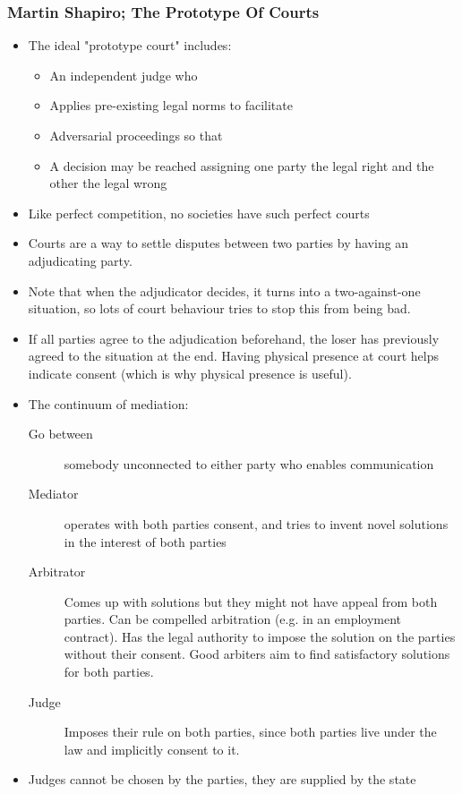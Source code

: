 \documentclass[11pt]{article}
\begin{document}
\subsubsection{Martin Shapiro; The Prototype Of Courts}
\label{sec:orgca5c35e}
\begin{itemize}
\item The ideal "prototype court" includes:
\begin{itemize}
\item An independent judge who
\item Applies pre-existing legal norms to facilitate
\item Adversarial proceedings so that
\item A decision may be reached assigning one party the legal right and the other
the legal wrong
\end{itemize}
\item Like perfect competition, no societies have such perfect courts
\item Courts are a way to settle disputes between two parties by having an
adjudicating party.
\item Note that when the adjudicator decides, it turns into a two-against-one
situation, so lots of court behaviour tries to stop this from being bad.
\item If all parties agree to the adjudication beforehand, the loser has previously
agreed to the situation at the end. Having physical presence at court helps
indicate consent (which is why physical presence is useful).
\item The continuum of mediation:
\begin{description}
\item[{Go between}] somebody unconnected to either party who enables communication
\item[{Mediator}] operates with both parties consent, and tries to invent novel
solutions in the interest of both parties
\item[{Arbitrator}] Comes up with solutions but they might not have appeal from
both parties. Can be compelled arbitration (e.g. in an employment contract).
Has the legal authority to impose the solution on the parties without their
consent. Good arbiters aim to find satisfactory solutions for both parties.
\item[{Judge}] Imposes their rule on both parties, since both parties live under
the law and implicitly consent to it.
\end{description}
\item Judges cannot be chosen by the parties, they are supplied by the state

\end{itemize}
\end{document}
